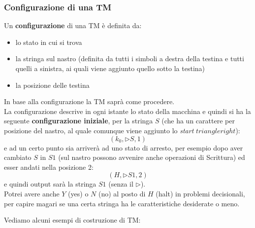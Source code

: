 \subsubsection{Configurazione di una TM}
\begin{definizione}
  Un \textbf{configurazione} di una TM è definita da:
  \begin{itemize}
    \item lo stato in cui si trova
    \item la stringa sul nastro (definita da tutti i simboli a destra della
    testina e tutti quelli a sinistra, ai quali viene aggiunto quello sotto la
    testina)
    \item la posizione delle testina 
  \end{itemize}
  In base alla configurazione la TM saprà come procedere.\\
  La configurazione descrive in ogni istante lo stato della macchina e quindi si
  ha la seguente \textbf{configurazione iniziale}, per la stringa $S$ (che ha un
  carattere per posizione del nastro, al quale comunque viene aggiunto lo
  \textit{start} $triangleright$):
  \[(k_0,\triangleright S, 1)\]
  e ad un certo punto sia arriverà ad uno stato di arresto, per esempio dopo
  aver cambiato $S$ in $S1$ (sul nastro possono avvenire anche operazioni di Scrittura) ed esser andati nella posizione 2:
  \[(H,\triangleright S1, 2)\]
  e quindi output sarà la stringa $S1$ (senza il $\triangleright$).\\
  Potrei avere anche $Y$ (yes) o $N$ (no) al posto di $H$ (halt) in problemi decisionali, per
  capire magari se una certa stringa ha le caratteristiche desiderate o meno.
\end{definizione}
Vediamo alcuni esempi di costruzione di TM:
